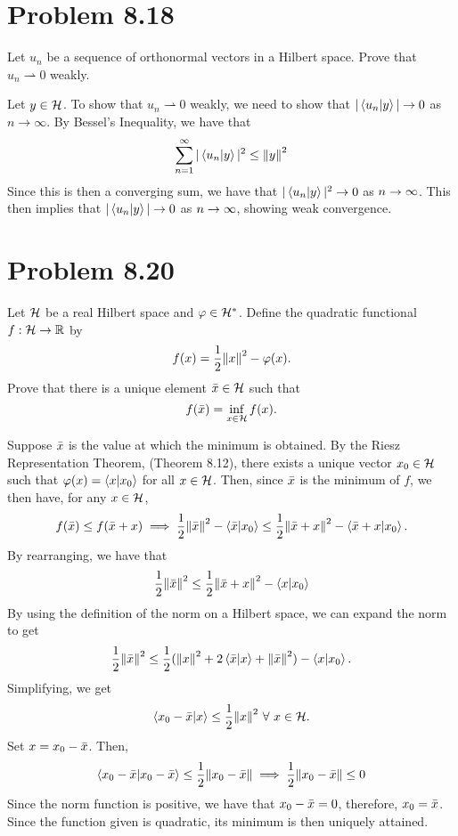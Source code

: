 \newpage
\section{Problem 8.18}
Let $u_n$ be a sequence of orthonormal vectors in a Hilbert space. Prove that $u_n \rightharpoonup 0$ weakly.  
\partbreak
\begin{solution}

    Let $y \in \mathcal{H}$. To show that $u_n \rightharpoonup 0$ weakly, we need to show that $|\braket{u_n}{y}| \to 0$ as $n \to \infty.$ By Bessel's Inequality, we have that 
    \[\sum_{n = 1}^\infty |\braket{u_n}{y}|^2 \leq \norm{y}^2\]
    Since this is then a converging sum, we have that $|\braket{u_n}{y}|^2 \to 0$ as $n \rightarrow \infty$. This then implies that $|\braket{u_n}{y}| \to 0$ as $n \rightarrow \infty$, showing weak convergence.   
\end{solution}

\newpage
\section{Problem 8.20}
\newcommand{\xbar}{\Bar{x}}
Let $\mathcal{H}$ be a real Hilbert space and $\varphi \in \mathcal{H}^{*}$. Define the quadratic functional $f: \mathcal{H} \rightarrow \mathbb{R}$ by 
\[f(x) = \frac{1}{2}\norm{x}^2 - \varphi(x).\]
Prove that there is a unique element $\xbar \in \scH$ such that 
\[f(\xbar) = \inf_{x \in \scH} f(x).\]
\partbreak
\begin{solution}

    Suppose $\xbar$ is the value at which the minimum is obtained. By the Riesz Representation Theorem, (Theorem 8.12), there exists a unique vector $x_0 \in \mathcal{H}$ such that $\varphi(x) = \braket{x}{x_0}$ for all $x \in \mathcal{H}$. Then, since $\xbar$ is the minimum of $f$, we then have, for any $x \in \mathcal{H}$,
    \[f(\xbar) \leq f(\xbar + x) \implies \frac{1}{2}\norm{\xbar}^2 - \braket{\xbar}{x_0}  \leq \frac{1}{2}\norm{\xbar + x}^2 - \braket{\xbar + x}{x_0}.\]
    By rearranging, we have that 
    \[\frac{1}{2}\norm{\xbar}^2  \leq \frac{1}{2}\norm{\xbar + x}^2 - \braket{x}{x_0}\]
    By using the definition of the norm on a Hilbert space, we can expand the norm to get
    \[\frac{1}{2}\norm{\xbar}^2  \leq \frac{1}{2}(\norm{x}^2 + 2\braket{\xbar}{x} + \norm{\xbar}^2) - \braket{x}{x_0}.\]
    Simplifying, we get 
    \[\braket{x_0 - \xbar}{x} \leq \frac{1}{2}\norm{x}^2 \ \forall \ x \in \scH.\]
    Set $x = x_0 - \xbar$. Then,
    \[\braket{x_0 - \xbar} \leq \frac{1}{2}\norm{x_0 - \xbar} \implies \frac{1}{2}\norm{x_0 - \xbar} \leq 0\]
    Since the norm function is positive, we have that $x_0 - \xbar = 0$, therefore, $x_0 = \xbar$. Since the function given is quadratic, its minimum is then uniquely attained. 
\end{solution}

